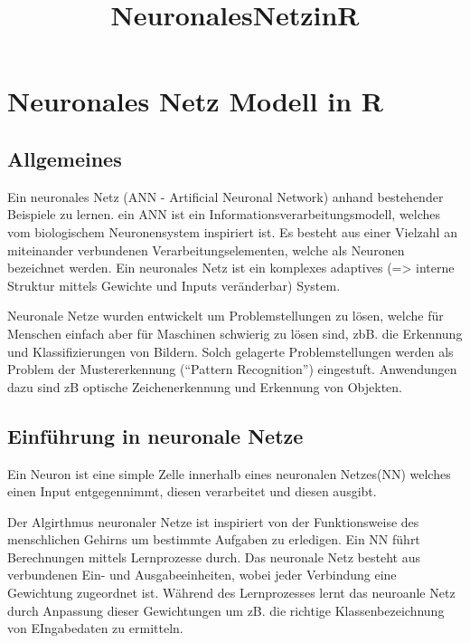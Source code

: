 \documentclass[]{article}
\title{NeuronalesNetzinR}
\author{}
\date{}
\begin{document}
\maketitle

\section{Neuronales Netz Modell in R}\label{neuronales-netz-modell-in-r}

\subsection{Allgemeines}\label{allgemeines}

Ein neuronales Netz (ANN - Artificial Neuronal Network) anhand
bestehender Beispiele zu lernen. ein ANN ist ein
Informationsverarbeitungsmodell, welches vom biologischem Neuronensystem
inspiriert ist. Es besteht aus einer Vielzahl an miteinander verbundenen
Verarbeitungselementen, welche als Neuronen bezeichnet werden. Ein
neuronales Netz ist ein komplexes adaptives (=\textgreater{} interne
Struktur mittels Gewichte und Inputs veränderbar) System.

Neuronale Netze wurden entwickelt um Problemstellungen zu lösen, welche
für Menschen einfach aber für Maschinen schwierig zu lösen sind, zbB.
die Erkennung und Klassifizierungen von Bildern. Solch gelagerte
Problemstellungen werden als Problem der Mustererkennung (``Pattern
Recognition'') eingestuft. Anwendungen dazu sind zB optische
Zeichenerkennung und Erkennung von Objekten.

\subsection{Einführung in neuronale
Netze}\label{einfuhrung-in-neuronale-netze}

Ein Neuron ist eine simple Zelle innerhalb eines neuronalen Netzes(NN)
welches einen Input entgegennimmt, diesen verarbeitet und diesen
ausgibt.

Der Algirthmus neuronaler Netze ist inspiriert von der Funktionsweise
des menschlichen Gehirns um bestimmte Aufgaben zu erledigen. Ein NN
führt Berechnungen mittels Lernprozesse durch. Das neuronale Netz
besteht aus verbundenen Ein- und Ausgabeeinheiten, wobei jeder
Verbindung eine Gewichtung zugeordnet ist. Während des Lernprozesses
lernt das neuroanle Netz durch Anpassung dieser Gewichtungen um zB. die
richtige Klassenbezeichnung von EIngabedaten zu ermitteln.
\end{document}
